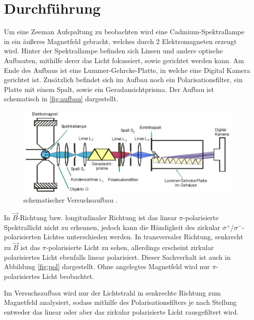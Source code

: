 \section{Durchführung}
\label{sec:durch}
Um eine Zeeman Aufspaltung zu beobachten wird eine Cadmium-Spektrallampe in ein äußeres Magnetfeld gebracht, welches durch 2 Elektromagneten erzeugt wird. Hinter der Spektrallampe befinden 
sich Linsen und andere optische Aufbauten, mithilfe derer das Licht fokussiert, sowie gerichtet werden kann. Am Ende des Aufbaus ist eine Lummer-Gehrcke-Platte, in welche eine 
Digital Kamera gerichtet ist. Zusätzlich befindet sich im Aufbau noch ein Polarisationsfilter, ein Platte mit einem Spalt, sowie ein Geradansichtprisma. Der Aufbau ist schematisch in \autoref{fig:aufbau} dargestellt.

\vspace{-5pt}
\begin{figure}[H]
    \centering
    \includegraphics[scale=0.3]{aufbau.png}
    \caption{schematischer Versuchsaufbau \cite{V27}.}
    \label{fig:aufbau}
\end{figure}

\noindent
In $\vec{B}$-Richtung bzw. longitudinaler Richtung ist das linear $\pi$-polarisierte Spektrallicht
nicht zu erkennen, jedoch kann die Händigkeit des zirkular $\sigma^{+}$/$\sigma^{-}$-polarisierten Lichtes
unterschieden werden. In transversaler Richtung, senkrecht zu $\vec{B}$ ist das $\pi$-polarisierte Licht
zu sehen, allerdings erscheint zirkular polarisiertes Licht ebenfalls linear polarisiert.
Dieser Sachverhalt ist auch in Abbildung \ref{fig:pol} dargestellt. Ohne angelegtes Magnetfeld
wird nur $\pi$-polarisiertes Licht beobachtet. 

\noindent
Im Versuchsaufbau wird nur der Lichtstrahl in senkrechte Richtung zum Magnetfeld analysiert, sodass mithilfe des Polarisationsfilters je nach Stellung entweder das linear oder
aber das zirkular polarisierte Licht rausgefiltert wird.

